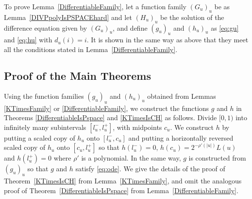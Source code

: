 


 To prove Lemma~\ref{DifferentiableFamily}, 
 let a function family $(G_u)_u$ be as Lemma~\ref{DIVPpolyIsPSPACEhard}
 and let $(H_u)_u$ be the solution of the difference equation given by $(G_u)_u$,
 and define $(g_u)_u$ and $(h_u)_u$ as \eqref{eq:gu} and \eqref{eq:hu}
 with $d_u(i) = i$.
 It is shown in the same way as above that they meet all the conditions
 stated in Lemma~\ref{DifferentiableFamily}.


\subsection{Proof of the Main Theorems}
\label{subsection: proof of theorems}
Using the function families $(g_u)_u$ and $(h_u)_u$ 
obtained from Lemmas \ref{KTimesFamily} or \ref{DifferentiableFamily}, 
we construct the functions $g$ and $h$ in 
Theorems \ref{DifferentiableIsPspace} and \ref{KTimesIsCH} as follows. 
Divide $[0,1)$ into infinitely many subintervals $[l^-_u, l^+_u]$,
with midpoints $c_u$.
We construct $h$ by putting a scaled copy of $h_u$ onto $[l^-_u, c_u]$ and
putting a horizontally reversed scaled copy of $h_u$ onto $[c_u, l^+_u]$ 
so that $h(l^-_u) = 0$, $h(c_u) = 2^{-\rho'(|u|)} L(u)$ and $h(l^+_u) = 0$ where $\rho'$ is a polynomial.
In the same way, $g$ is constructed from $(g_u)_u$ so that $g$ and $h$ satisfy \eqref{eq:ode}.
We give the details of the proof of 
Theorem~\ref{KTimesIsCH} from Lemma~\ref{KTimesFamily}, 
and omit the analogous proof of Theorem~\ref{DifferentiableIsPspace} 
from Lemma~\ref{DifferentiableFamily}. 


